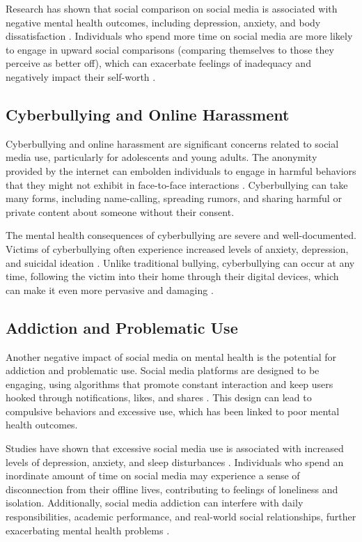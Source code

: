 \documentclass[12pt]{article}
\begin{document}
Research has shown that social comparison on social media is associated with negative mental health outcomes, including depression, anxiety, and body dissatisfaction \cite{lup2015}. Individuals who spend more time on social media are more likely to engage in upward social comparisons (comparing themselves to those they perceive as better off), which can exacerbate feelings of inadequacy and negatively impact their self-worth \cite{lup2015}.

\subsection{Cyberbullying and Online Harassment}

Cyberbullying and online harassment are significant concerns related to social media use, particularly for adolescents and young adults. The anonymity provided by the internet can embolden individuals to engage in harmful behaviors that they might not exhibit in face-to-face interactions \cite{tokunaga2010}. Cyberbullying can take many forms, including name-calling, spreading rumors, and sharing harmful or private content about someone without their consent.

The mental health consequences of cyberbullying are severe and well-documented. Victims of cyberbullying often experience increased levels of anxiety, depression, and suicidal ideation \cite{tokunaga2010}. Unlike traditional bullying, cyberbullying can occur at any time, following the victim into their home through their digital devices, which can make it even more pervasive and damaging \cite{tokunaga2010}.

\subsection{Addiction and Problematic Use}

Another negative impact of social media on mental health is the potential for addiction and problematic use. Social media platforms are designed to be engaging, using algorithms that promote constant interaction and keep users hooked through notifications, likes, and shares \cite{andreassen2017}. This design can lead to compulsive behaviors and excessive use, which has been linked to poor mental health outcomes.

Studies have shown that excessive social media use is associated with increased levels of depression, anxiety, and sleep disturbances \cite{andreassen2017}. Individuals who spend an inordinate amount of time on social media may experience a sense of disconnection from their offline lives, contributing to feelings of loneliness and isolation. Additionally, social media addiction can interfere with daily responsibilities, academic performance, and real-world social relationships, further exacerbating mental health problems \cite{andreassen2017}.
\end{document}
